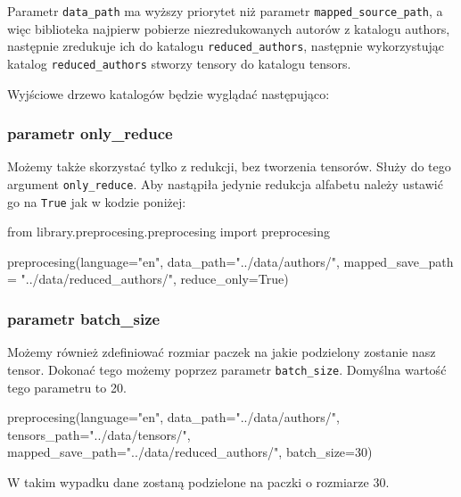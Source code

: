 Parametr \texttt{data\_path} ma wyższy priorytet niż parametr \texttt{mapped\_source\_path}, a więc biblioteka najpierw 
pobierze niezredukowanych autorów z katalogu authors, następnie zredukuje ich do katalogu \texttt{reduced\_authors},
następnie wykorzystując katalog \texttt{reduced\_authors} stworzy tensory do katalogu tensors.

Wyjściowe drzewo katalogów będzie wyglądać następująco:

\myspace
{}

\myspace

\subsubsection{parametr only\_reduce}
Możemy także skorzystać tylko z redukcji, bez tworzenia tensorów. Służy do tego argument \texttt{only\_reduce}.
Aby nastąpiła jedynie redukcja alfabetu należy ustawić go na \texttt{True} jak w kodzie poniżej:

\begin{python}
from library.preprocesing.preprocesing import preprocesing

preprocesing(language="en",
              data_path="../data/authors/",
              mapped_save_path = "../data/reduced_authors/",
              reduce_only=True) 

\end{python}

\subsubsection{parametr batch\_size}
Możemy również zdefiniować rozmiar paczek na jakie podzielony zostanie nasz tensor. Dokonać tego możemy poprzez
parametr \texttt{batch\_size}. Domyślna wartość tego parametru to 20.

\begin{python}
preprocesing(language="en",
              data_path="../data/authors/",
              tensors_path="../data/tensors/",
              mapped_save_path="../data/reduced_authors/",
              batch_size=30)

\end{python}


W takim wypadku dane zostaną podzielone na paczki o rozmiarze 30.


